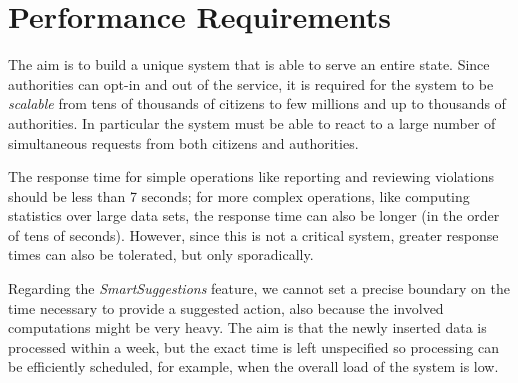 \section{Performance Requirements}
The aim is to build a unique system that is able to serve an entire state.
Since authorities can opt-in and out of the service, it is required for the
system to be \emph{scalable} from tens of thousands of citizens to few millions
and up to thousands of authorities. In particular the system must be able to
react to a large number of simultaneous requests from both citizens and
authorities.

The response time for simple operations like reporting and reviewing violations
should be less than 7 seconds; for more complex operations, like computing
statistics over large data sets, the response time can also be longer (in the
order of tens of seconds).
However, since this is not a critical system, greater response times can also
be tolerated, but only sporadically.

Regarding the \emph{SmartSuggestions} feature, we cannot set a precise boundary
on the time necessary to provide a suggested action, also because the involved
computations might be very heavy. The aim is that the newly inserted data
is processed within a week, but the exact time is left unspecified so
processing can be efficiently scheduled, for example, when the overall load
of the system is low.